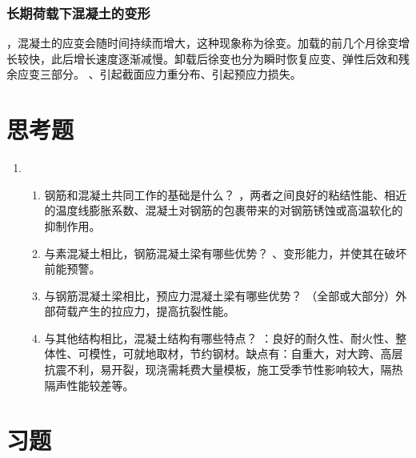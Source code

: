\documentclass{article}
\begin{document}
\subsubsection{长期荷载下混凝土的变形}
，混凝土的应变会随时间持续而增大，这种现象称为徐变。加载的前几个月徐变增长较快，此后增长速度逐渐减慢。卸载后徐变也分为瞬时恢复应变、弹性后效和残余应变三部分。
、引起截面应力重分布、引起预应力损失。
\appendix
\newcommand{\ans}{\par答：}
\section{思考题}
\begin{enumerate}
    \item
          \begin{enumerate}[1.]
              \item 钢筋和混凝土共同工作的基础是什么？
                    ，两者之间良好的粘结性能、相近的温度线膨胀系数、混凝土对钢筋的包裹带来的对钢筋锈蚀或高温软化的抑制作用。
              \item 与素混凝土相比，钢筋混凝土梁有哪些优势？
                    、变形能力，并使其在破坏前能预警。
              \item 与钢筋混凝土梁相比，预应力混凝土梁有哪些优势？
                    （全部或大部分）外部荷载产生的拉应力，提高抗裂性能。
              \item 与其他结构相比，混凝土结构有哪些特点？
                    ：良好的耐久性、耐火性、整体性、可模性，可就地取材，节约钢材。缺点有：自重大，对大跨、高层抗震不利，易开裂，现浇需耗费大量模板，施工受季节性影响较大，隔热隔声性能较差等。
          \end{enumerate}
\end{enumerate}
\section{习题}
\end{document}
